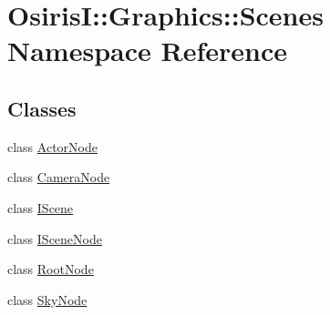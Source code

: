 \hypertarget{namespace_osiris_i_1_1_graphics_1_1_scenes}{\section{Osiris\-I\-:\-:Graphics\-:\-:Scenes Namespace Reference}
\label{namespace_osiris_i_1_1_graphics_1_1_scenes}
}
\subsection*{Classes}
\begin{DoxyCompactItemize}
\item 
class \hyperlink{class_osiris_i_1_1_graphics_1_1_scenes_1_1_actor_node}{Actor\-Node}
\item 
class \hyperlink{class_osiris_i_1_1_graphics_1_1_scenes_1_1_camera_node}{Camera\-Node}
\item 
class \hyperlink{class_osiris_i_1_1_graphics_1_1_scenes_1_1_i_scene}{I\-Scene}
\item 
class \hyperlink{class_osiris_i_1_1_graphics_1_1_scenes_1_1_i_scene_node}{I\-Scene\-Node}
\item 
class \hyperlink{class_osiris_i_1_1_graphics_1_1_scenes_1_1_root_node}{Root\-Node}
\item 
class \hyperlink{class_osiris_i_1_1_graphics_1_1_scenes_1_1_sky_node}{Sky\-Node}
\end{DoxyCompactItemize}
